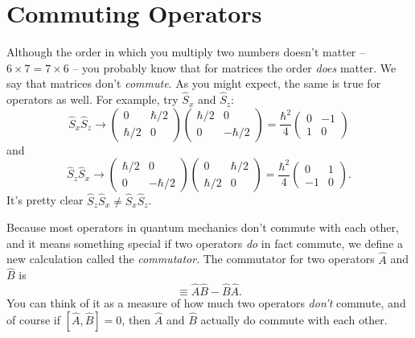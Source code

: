 \section{Commuting Operators}

Although the order in which you multiply two numbers doesn't matter -- $6 \times 7 = 7 \times 6$ -- you probably know that for matrices the order \emph{does} matter.  We say that matrices don't \emph{commute}. As you might expect, the same is true for operators as well.  For example, try $\hat{S}_x$ and $\hat{S}_z$:
\[
\hat{S}_x\hat{S}_z \to \begin{pmatrix}  0 & \hbar/2 \\ \hbar/2 & 0 \end{pmatrix} \begin{pmatrix}  \hbar/2 & 0 \\ 0 & -\hbar/2 \end{pmatrix} = \frac{\hbar^2}{4} \begin{pmatrix} 0 & -1 \\ 1 & 0 \end{pmatrix}
\]
and
\[
\hat{S}_z\hat{S}_x \to  \begin{pmatrix}  \hbar/2 & 0 \\ 0 & -\hbar/2 \end{pmatrix}\begin{pmatrix}  0 & \hbar/2 \\ \hbar/2 & 0 \end{pmatrix} = \frac{\hbar^2}{4} \begin{pmatrix} 0 & 1 \\ -1 & 0 \end{pmatrix}.
\]
It's pretty clear $\hat{S}_z \hat{S}_x \neq \hat{S}_x \hat{S}_z$.  

Because most operators in quantum mechanics don't commute with each other, and it means something special if two operators \emph{do} in fact commute, we define a new calculation called the \emph{commutator}.  The commutator for two operators $\hat{A}$ and $\hat{B}$ is 
\begin{equation}
[\hat{A}, \hat{B}] \equiv \hat{A}\hat{B} - \hat{B} \hat{A}.
\end{equation}
You can think of it as a measure of how much two operators \emph{don't} commute, and of course if $[\hat{A}, \hat{B} ] = 0$, then $\hat{A}$ and $\hat{B}$ actually do commute with each other.

